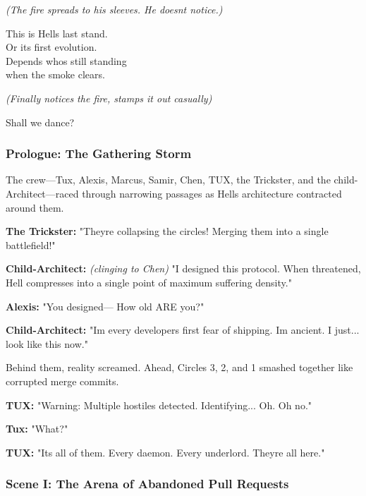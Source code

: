 \emph{(The fire spreads to his sleeves. He doesn\textquotesingle t notice.)}

This is Hell\textquotesingle s last stand.\\
Or its first evolution.\\
Depends who\textquotesingle s still standing\\
when the smoke clears.

\emph{(Finally notices the fire, stamps it out casually)}

Shall we dance?

\bookdivider

\subsubsection{Prologue: The Gathering Storm}\label{prologue-the-gathering-storm}

The crew---Tux, Alexis, Marcus, Samir, Chen, TUX, the Trickster, and the child-Architect---raced through narrowing passages as Hell\textquotesingle s architecture contracted around them.

\textbf{The Trickster:} "They\textquotesingle re collapsing the circles! Merging them into a single battlefield!"

\textbf{Child-Architect:} \emph{(clinging to Chen)} "I designed this protocol. When threatened, Hell compresses into a single point of maximum suffering density."

\textbf{Alexis:} "You designed--- How old ARE you?"

\textbf{Child-Architect:} "I\textquotesingle m every developer\textquotesingle s first fear of shipping. I\textquotesingle m ancient. I just... look like this now."

Behind them, reality screamed. Ahead, Circles 3, 2, and 1 smashed together like corrupted merge commits.

\textbf{TUX:} "Warning: Multiple hostiles detected. Identifying... Oh. Oh no."

\textbf{Tux:} "What?"

\textbf{TUX:} "It\textquotesingle s all of them. Every daemon. Every underlord. They\textquotesingle re all here."

\bookdivider

\subsubsection{Scene I: The Arena of Abandoned Pull Requests}\label{scene-i-the-arena-of-abandoned-pull-requests}

